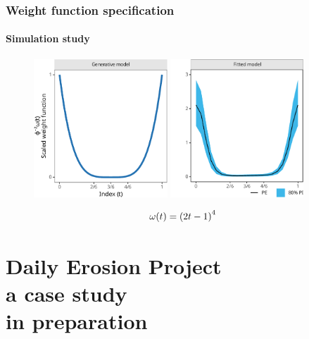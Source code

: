 \documentclass{snedecorbeamer}
\begin{document}
\begin{frame}
  \frametitle{Weight function specification}
  \framesubtitle{Simulation study}
  \begin{figure}
    \centering
    \includegraphics[height=14em]{inc/sim_truth_U1a_fsc070.pdf}
    \includegraphics[height=14em]{inc/sim_posterior_U1a_fsc070.pdf}
  \end{figure}
  \begin{equation}
    \tiny
    \omega(t)
    ={(2 t - 1)}^4
  \end{equation}
\end{frame}

\section{Daily Erosion Project \\ {\small a case study} \\
{\tiny in preparation}}
\end{document}
